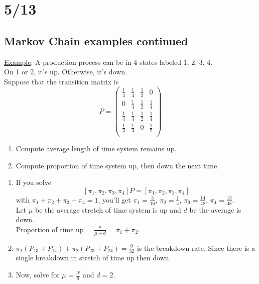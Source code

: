 \section*{5/13}
  \subsection*{Markov Chain examples continued}
    \underline{Example}: A production process can be in 4 states labeled 1, 
    2, 3, 4.\\
    On 1 or 2, it's up. Otherwise, it's down.\\
    Suppose that the transition matrix is
    $$
      P = \left(
      \begin{array}{cccc}
        \frac{1}{4} & \frac{1}{4} & \frac{1}{2} & 0\\
        0 & \frac{1}{4} & \frac{1}{2} & \frac{1}{4}\\
        \frac{1}{4} & \frac{1}{4} & \frac{1}{2} & \frac{1}{4}\\
        \frac{1}{4} & \frac{1}{4} & 0 & \frac{1}{2} \\
      \end{array}      \right)
    $$
    \begin{enumerate}
      \item Compute average length of time system remains up.
      \item Compute proportion of time system up, then down the next time.
    \end{enumerate}
    \begin{enumerate}
      \item
    If you solve
    $$
      [\pi_1, \pi_2, \pi_3, \pi_4] P = [\pi_1, \pi_2, \pi_3, \pi_4]
    $$
    with $\pi_1 + \pi_2 + \pi_3 + \pi_4 = 1$, you'll
    get $\pi_1 = \frac{3}{16}$, $\pi_2 = \frac{1}{4}$, $\pi_3 = \frac{14}{48}$,
    $\pi_4 = \frac{13}{48}$.\\
    Let $\mu$ be the average stretch of time system is up and $d$ be the average
    is down.\\
    Proportion of time up = $\frac{\mu}{\mu + d} = \pi_1 + \pi_2$.
      \item $\pi_1(P_{13} + P_{14}) + \pi_2 (P_{23} + P_{24}) = \frac{9}{32}$
        is the breakdown rate. Since there is a single breakdown in stretch of
        time up then down.
      \item Now, solve for $\mu = \frac{N}{9}$ and $d = 2$.
    \end{enumerate}

